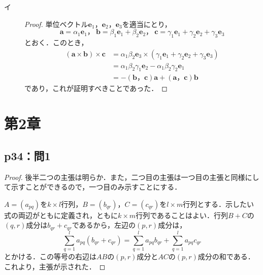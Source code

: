 \documentclass[uplatex,dvipdfmx,a4paper,10pt,fleqn]{jsarticle}
\begin{document}
\begin{tleftbar}
    \begin{description}
        \item[イ] 
    \begin{proof}
    単位ベクトル$\bm{e}_1$，$\bm{e}_2$，$\bm{e}_3$を適当にとり，
    \[
    \bm{a} = \alpha_1 \bm{e}_1，~\bm{b} = \beta_1 \bm{e}_1+\beta_2 \bm{e}_2，~\bm{c}= \gamma_1 \bm{e}_1 + \gamma_2 \bm{e}_2 + \gamma_3 \bm{e}_3
    \]
    とおく．このとき，
        \begin{align*}
            (\bm{a} \times \bm{b}) \times \bm{c} &= \alpha_1 \beta_2 \bm{e}_3 \times (\gamma_1 \bm{e}_1 + \gamma_2 \bm{e}_2 + \gamma_3 \bm{e}_3) \\
            & = \alpha_1 \beta_2 \gamma_1 \bm{e}_2 - \alpha_1 \beta_2 \gamma_2 \bm{e}_1 \\
            & = -(\bm{b}，\bm{c})\bm{a}+(\bm{a}，\bm{c}) \bm{b}
        \end{align*}
        であり，これが証明すべきことであった．
    \end{proof}
\end{description}
    \end{tleftbar}
\newpage


\section*{第2章}


\subsection*{p34：問1}

\begin{tleftbar}
\begin{proof}
後半二つの主張は明らか．また，二つ目の主張は一つ目の主張と同様にして示すことができるので，一つ目のみ示すことにする．


$A=(a_{pq})$を$k \times l$行列，$B= (b_{qr})$，$C=(c_{qr})$を$l \times m$行列とする．示したい式の両辺がともに定義され，ともに$k \times m$行列であることはよい．行列$B+C$の$(q,r)$成分は$b_{qr}+c_{qr}$であるから，左辺の$(p,r)$成分は，
\[
\sum_{q=1}^{l}a_{pq}\left(b_{qr}+c_{qr}\right)=\sum_{q=1}^{l}a_{pq}b_{qr}+\sum_{q=1}^{l}a_{pq}c_{qr}
\]
とかける．この等号の右辺は$AB$の$(p,r)$成分と$AC$の$(p,r)$成分の和である．これより，主張が示された．
\end{proof}
\end{tleftbar}
\end{document}
